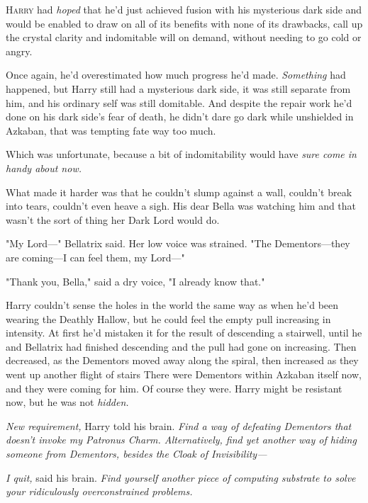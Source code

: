 
\lettrine{H}{arry} had
\emph{hoped} that he'd just achieved fusion with his mysterious dark side and
would be enabled to draw on all of its benefits with none of its drawbacks,
call up the crystal clarity and indomitable will on demand, without needing to
go cold or \mbox{angry}.

Once again, he'd overestimated how much progress he'd made. \emph{Something}
had happened, but Harry still had a mysterious dark side, it was still separate
from him, and his ordinary self was still domitable. And despite the repair
work he'd done on his dark side's fear of death, he didn't dare go dark while
unshielded in Azkaban, that was tempting fate way too much.

Which was unfortunate, because a bit of indomitability would have \emph{sure
come in handy about now.}

What made it harder was that he couldn't slump against a wall, couldn't break
into tears, couldn't even heave a sigh. His dear Bella was watching him and
that wasn't the sort of thing her Dark Lord would do.

"My Lord\mbox{---}" Bellatrix said. Her low voice was strained. "The Dementors---they
are coming---I can feel them, my Lord\mbox{---}"

"Thank you, Bella," said a dry voice, "I already know that."

Harry couldn't sense the holes in the world the same way as when he'd been
wearing the Deathly Hallow, but he could feel the empty pull increasing in
intensity. At first he'd mistaken it for the result of descending a stairwell,
until he and Bellatrix had finished descending and the pull had gone on
increasing. Then decreased, as the Dementors moved away along the spiral, then
increased as they went up another flight of stairs{\el} There were Dementors
within Azkaban itself now, and they were coming for him. Of course they were.
Harry might be resistant now, but he was not \emph{hidden.}

\emph{New requirement,} Harry told his brain. \emph{Find a way of defeating
Dementors that doesn't invoke my Patronus Charm. Alternatively, find yet
another way of hiding someone from Dementors, besides the Cloak of
Invisibility---}

\emph{I quit,} said his brain. \emph{Find yourself another piece of computing
substrate to solve your ridiculously overconstrained problems.}

